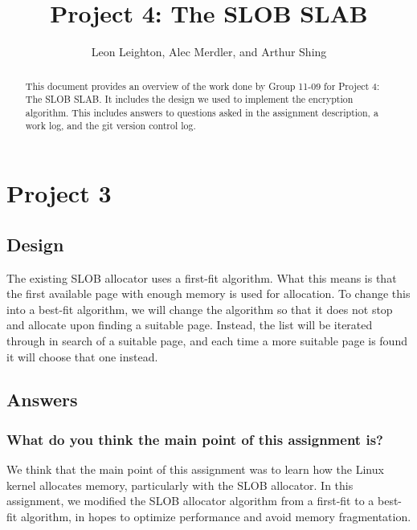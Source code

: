 \documentclass[journal, letterpaper, draftclsnofoot, onecolumn, 10pt]{IEEEtran}
\begin{document}
\title{Project 4: The SLOB SLAB}
\author{Leon Leighton, Alec Merdler, and Arthur Shing}

\begin{titlepage}
    \centering
    \maketitle
    \begin{abstract}
      This document provides an overview of the work done by Group 11-09 for Project 4: The SLOB SLAB.
      It includes the design we used to implement the encryption algorithm.
      This includes answers to questions asked in the assignment description, a work log, and the git version control log.
    \end{abstract}


\end{titlepage}
\tableofcontents
\clearpage

\section{Project 3}

\subsection{Design}

The existing SLOB allocator uses a first-fit algorithm. What this means is that the first available page with enough memory is used for allocation.
To change this into a best-fit algorithm, we will change the algorithm so that it does not stop and allocate upon finding a suitable page.
Instead, the list will be iterated through in search of a suitable page, and each time a more suitable page is found it will choose that one instead.


\subsection{Answers}

\subsubsection{What do you think the main point of this assignment is?}

We think that the main point of this assignment was to learn how the Linux kernel allocates memory, particularly with the SLOB allocator.
In this assignment, we modified the SLOB allocator algorithm from a first-fit to a best-fit algorithm, in hopes to optimize performance and avoid memory fragmentation. \\
\end{document}
